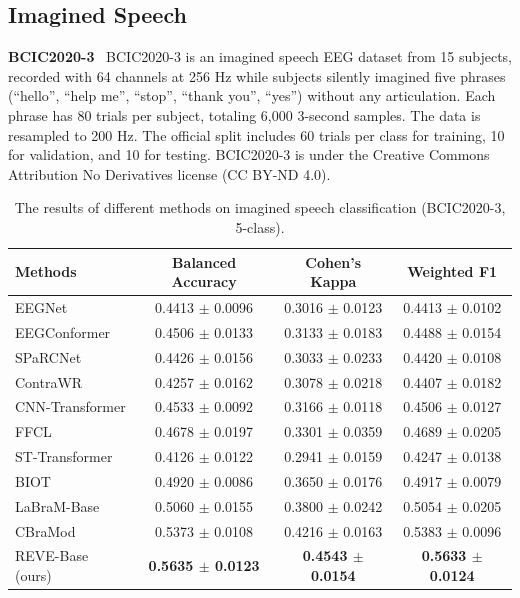 \documentclass{article}
\begin{document}
\subsection{Imagined Speech}

\textbf{BCIC2020-3}~\citep{jeong20222020} 
BCIC2020-3 is an imagined speech EEG dataset from 15 subjects, recorded with 64 channels at 256 Hz while subjects silently imagined five phrases (“hello”, “help me”, “stop”, “thank you”, “yes”) without any articulation. Each phrase has 80 trials per subject, totaling 6,000 3-second samples. The data is resampled to 200 Hz. The official split includes 60 trials per class for training, 10 for validation, and 10 for testing.
BCIC2020-3 is under the Creative Commons Attribution No Derivatives license (CC BY-ND 4.0).

\begin{table}[H]
\centering
\caption{The results of different methods on imagined speech classification (BCIC2020-3, 5-class).}
\small
\begin{tabular}{lccc} 
\toprule
\textbf{Methods} & \textbf{Balanced Accuracy} & \textbf{Cohen’s Kappa} & \textbf{Weighted F1} \\
\midrule
EEGNet            & 0.4413 $\pm$ 0.0096 & 0.3016 $\pm$ 0.0123 & 0.4413 $\pm$ 0.0102 \\
EEGConformer      & 0.4506 $\pm$ 0.0133 & 0.3133 $\pm$ 0.0183 & 0.4488 $\pm$ 0.0154 \\
SPaRCNet          & 0.4426 $\pm$ 0.0156 & 0.3033 $\pm$ 0.0233 & 0.4420 $\pm$ 0.0108 \\
ContraWR          & 0.4257 $\pm$ 0.0162 & 0.3078 $\pm$ 0.0218 & 0.4407 $\pm$ 0.0182 \\
CNN-Transformer   & 0.4533 $\pm$ 0.0092 & 0.3166 $\pm$ 0.0118 & 0.4506 $\pm$ 0.0127 \\
FFCL              & 0.4678 $\pm$ 0.0197 & 0.3301 $\pm$ 0.0359 & 0.4689 $\pm$ 0.0205 \\
ST-Transformer    & 0.4126 $\pm$ 0.0122 & 0.2941 $\pm$ 0.0159 & 0.4247 $\pm$ 0.0138 \\
\midrule
BIOT              & 0.4920 $\pm$ 0.0086 & 0.3650 $\pm$ 0.0176 & 0.4917 $\pm$ 0.0079 \\
LaBraM-Base       & 0.5060 $\pm$ 0.0155 & 0.3800 $\pm$ 0.0242 & 0.5054 $\pm$ 0.0205 \\
CBraMod           & 0.5373 $\pm$ 0.0108 & 0.4216 $\pm$ 0.0163 & 0.5383 $\pm$ 0.0096 \\
\midrule
REVE-Base (ours)        & \textbf{0.5635 $\pm$ 0.0123} & \textbf{0.4543 $\pm$ 0.0154} & \textbf{0.5633 $\pm$ 0.0124}  \\
\bottomrule
\end{tabular}

\label{tab:Speech}
\end{table}
\end{document}

